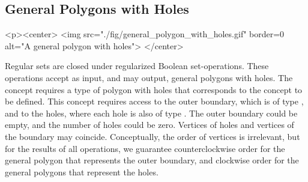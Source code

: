 \subsection{General Polygons with Holes}
\label{bso_ssec:general_polygons_with_holes}
\begin{ccHtmlOnly}
  <p><center>
    <img src="./fig/general_polygon_with_holes.gif" border=0 alt="A
    general polygon with holes">
  </center>
\end{ccHtmlOnly}
Regular sets are closed under regularized Boolean set-operations.
These operations accept as input, and may output, general
polygons with holes. The concept 
requires a type of polygon with holes that corresponds to the concept
 to be defined. This concept requires 
access to the outer boundary, which is of type ,
and to the holes, where each hole is also of type .
The outer boundary could be empty, and the number of holes could be
zero. Vertices of holes and vertices of the boundary may coincide.
Conceptually, the order of vertices is irrelevant, but for the results
of all operations, we guarantee counterclockwise order for the general
polygon that represents the outer boundary, and clockwise order for
the general polygons that represent the holes.

